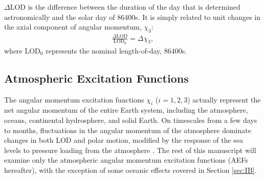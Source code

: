 \documentclass[draft,jgrga]{agutex}
\begin{document}
\begin{article}
$\Delta$LOD is the difference between the duration of the day that is determined astronomically and the solar day of 86400s.
It is simply related to unit changes in the axial component of angular momentum, $\chi_3$:
\begin{eqnarray}
\frac{\Delta \text{LOD}}{ \text{LOD}_0 } = \Delta \chi_3,
\label{eq:LOD_to_AEF}
\end{eqnarray}
where LOD$_0$  {represents the nominal length-of-day, 86400s}.

\subsection{Atmospheric Excitation Functions}

 {The angular momentum excitation functions}  $\chi_i$ ($i=1,2,3$)  {actually represent the net angular momentum of the entire Earth system, including the atmosphere, oceans, continental hydrosphere, and solid Earth.
On timescales from a few days to months, fluctuations in the angular momentum of the atmosphere dominate changes in both LOD} \citep{Rosen1983, Rosen1990}  {and polar motion, modified by the response of the sea levels to pressure loading from the atmosphere} \citep{Eubanks1988}.
 {The rest of this manuscript will examine only the atmospheric angular momentum excitation functions (AEFs hereafter), with the exception of some oceanic effects covered in Section} \ref{sec:IB}.


\end{article}
\end{document}
